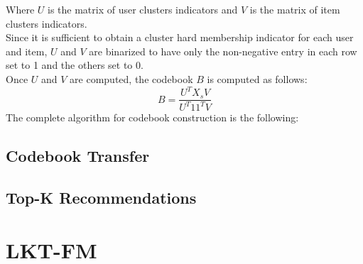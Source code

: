 Where $U$ is the matrix of user clusters indicators and $V$ is the matrix of item clusters indicators.\\
Since it is sufficient to obtain a cluster hard membership indicator for each user and item, $U$ and $V$ are binarized to have only the non-negative entry in each row set to 1 and the others set to 0.\\
Once $U$ and $V$ are computed, the codebook $B$ is computed as follows:
\begin{equation}
B = \frac{U^T X_s V}{U^T 11^T V}
\end{equation}
The complete algorithm for codebook construction is the following:



\subsection{Codebook Transfer}


\subsection{Top-K Recommendations}



\section{LKT-FM}
